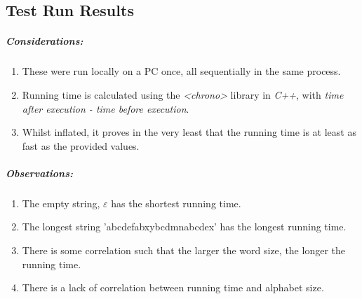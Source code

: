 \documentclass{article}
\begin{document}
	\subsection{Test Run Results}
	\subparagraph{Considerations: }
	\begin{enumerate}
		\item These were run locally on a PC once, all sequentially in the same process.
		\item Running time is calculated using the \textit{<chrono>} library in \textit{C++}, with \textit{time after execution - time before execution}.
		\item Whilst inflated, it proves in the very least that the running time is at least as fast as the provided values.
	\end{enumerate}
	
	\subparagraph{Observations: }
	\begin{enumerate}
		\item The empty string, $\varepsilon$ has the shortest running time.
		\item The longest string 'abcdefabxybcdmnabcdex' has the longest running time.
		\item There is some correlation such that the larger the word size, the longer the running time.
		\item There is a lack of correlation between running time and alphabet size.
	\end{enumerate}
	
\end{document}
